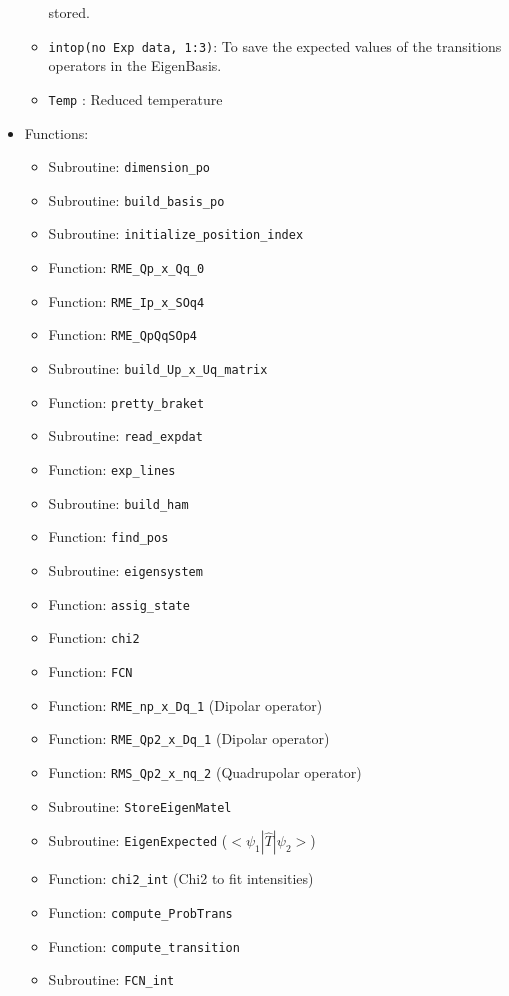 \documentclass[english,twoside, openright]{report}
\begin{document}
\begin{itemize}
\begin{itemize}
    stored.
  \item \texttt{intop(no Exp data, 1:3)}: To save the expected values
    of the transitions operators in the EigenBasis.
  \item \texttt{Temp} : Reduced temperature
  \end{itemize}
\item Functions:
  \begin{itemize}
  \item Subroutine: \texttt{dimension\_po}
  \item Subroutine: \texttt{build\_basis\_po}
  \item Subroutine: \texttt{initialize\_position\_index}
  \item Function: \texttt{RME\_Qp\_x\_Qq\_0}
  \item Function: \texttt{RME\_Ip\_x\_SOq4}
  \item Function: \texttt{RME\_QpQqSOp4}
  \item Subroutine: \texttt{build\_Up\_x\_Uq\_matrix}
  \item Function: \texttt{pretty\_braket}
  \item Subroutine: \texttt{read\_expdat}
  \item Function: \texttt{exp\_lines}
  \item Subroutine: \texttt{build\_ham}
  \item Function: \texttt{find\_pos}
  \item Subroutine: \texttt{eigensystem}
  \item Function: \texttt{assig\_state}
  \item Function: \texttt{chi2}
  \item Function: \texttt{FCN}
  \item Function: \texttt{RME\_np\_x\_Dq\_1} (Dipolar operator)
  \item Function: \texttt{RME\_Qp2\_x\_Dq\_1} (Dipolar operator)
  \item Function: \texttt{RMS\_Qp2\_x\_nq\_2} (Quadrupolar operator)
  \item Subroutine: \texttt{StoreEigenMatel}
  \item Subroutine: \texttt{EigenExpected} ($<\psi_1| \hat T | \psi_2 >$)
  \item Function: \texttt{chi2\_int} (Chi2 to fit intensities)
  \item Function: \texttt{compute\_ProbTrans}
  \item Function: \texttt{compute\_transition}
  \item Subroutine: \texttt{FCN\_int}
  \end{itemize}
\end{itemize}
\end{document}
